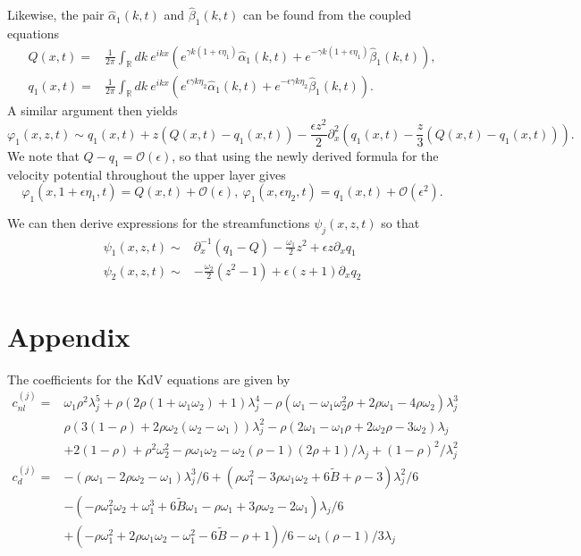 \documentclass[a4paper,11pt]{article}
\newcommand{\p}{\partial}
\begin{document}
Likewise, the pair $\hat{\alpha}_{1}(k,t)$ and $\hat{\beta}_{1}(k,t)$ can be found from the coupled equations
\begin{align*}
Q(x,t) = & \frac{1}{2\pi}\int_{\mathbb{R}}dk ~e^{ikx}\left(e^{\gamma k (1+\epsilon\eta_{1})} \hat{\alpha}_{1}(k,t)  + e^{-\gamma k (1+\epsilon\eta_{1})}\hat{\beta}_{1}(k,t)\right),\\
q_{1}(x,t) = & \frac{1}{2\pi}\int_{\mathbb{R}}dk ~e^{ikx}\left( e^{\epsilon\gamma k \eta_{2}}\hat{\alpha}_{1}(k,t) +  e^{-\epsilon\gamma k \eta_{2}}\hat{\beta}_{1}(k,t)\right).
\end{align*}
A similar argument then yields
\[
\varphi_{1}(x,z,t)\sim q_{1}(x,t) + z(Q(x,t)-q_{1}(x,t)) - \frac{\epsilon z^{2}}{2}\p_{x}^{2}\left( q_{1}(x,t)- \frac{z}{3}(Q(x,t)-q_{1}(x,t)) \right).
\]
We note that $Q-q_{1} = \mathcal{O}(\epsilon)$, so that using the newly derived formula for the velocity potential throughout the upper layer gives 
\[
\varphi_{1}(x,1+\epsilon \eta_{1},t) = Q(x,t) + \mathcal{O}(\epsilon), ~ \varphi_{1}(x,\epsilon\eta_{2},t) = q_{1}(x,t) + \mathcal{O}(\epsilon^{2}).
\]

We can then derive expressions for the streamfunctions $\psi_{j}(x,z,t)$ so that 
\begin{align*}
\psi_{1}(x,z,t) \sim & \p_{x}^{-1}(q_{1}-Q) - \frac{\omega_{1}}{2}z^{2} + \epsilon z \p_{x}q_{1}\\
\psi_{2}(x,z,t) \sim & -\frac{\omega_{2}}{2}(z^{2}-1) + \epsilon(z+1)\p_{x}q_{2}
\end{align*}
\section*{Appendix}
The coefficients for the KdV equations are given by 
\begin{align*}
c_{nl}^{(j)} = & \omega_{1}\rho^2\lambda_{j}^5+\rho(2\rho(1+\omega_{1}\omega_{2})+ 1)\lambda_{j}^4 -\rho\left(\omega_{1}-\omega_{1}\omega_{2}^{2}\rho+2\rho\omega_{1}-4\rho\omega_{2}\right)\lambda_{j}^3\\
&\rho\left(3(1-\rho) + 2\rho\omega_{2}(\omega_{2}-\omega_{1}) \right)\lambda_{j}^2 - \rho\left(2\omega_{1}-\omega_{1}\rho + 2\omega_{2}\rho-3\omega_{2} \right)\lambda_{j}\\
& + 2(1-\rho)+\rho^2\omega_{2}^2-\rho\omega_{1}\omega_{2}  -\omega_{2}(\rho-1)(2\rho+1)/\lambda_{j}+ (1-\rho)^2/\lambda_{j}^2 \\
c_{d}^{(j)} = & -(\rho\omega_{1}-2\rho\omega_2-\omega_1)\lambda_{j}^3/6+(\rho\omega_1^2-3\rho\omega_1\omega_2+6\tilde{B}+\rho-3)\lambda_{j}^2/6\\
& -(-\rho\omega_1^2\omega_2+\omega_1^3+6\tilde{B}\omega_1-\rho\omega_1+3\rho\omega_2-2\omega_{1})\lambda_{j}/6\\
& +(-\rho\omega_1^2+2\rho\omega_1\omega_2-\omega_1^2-6\tilde{B}-\rho+1)/6-\omega_{1}(\rho -1)/3\lambda_{j}
\end{align*}





\end{document}
